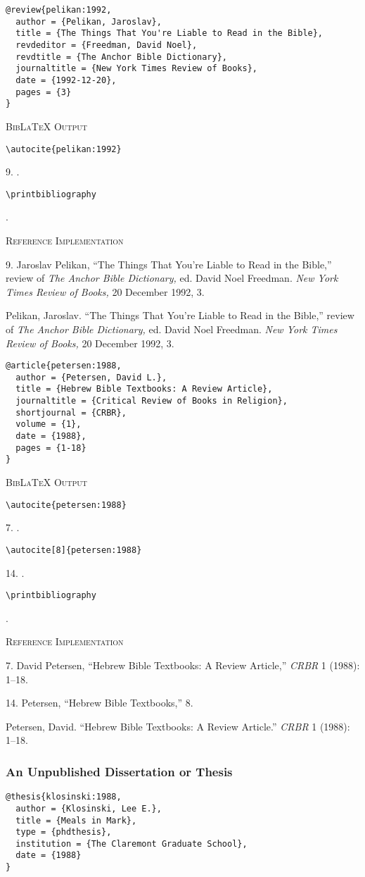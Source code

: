 \documentclass[a4paper]{article}
\newcommand\citetestnpf[4]{%
  {\textsc{BibLaTeX Output}\par
   \nobreak
   \texttt{\textbackslash autocite\{#4\}}\par
   \color{biblatex-colour}
   #1. \cite{#4}.\par
   \color{black}
   \texttt{\textbackslash autocite[#3]\{#4\}}\par
   \color{biblatex-colour}
   #2. \cite[#3]{#4}.\par
   \color{black}
   \texttt{\textbackslash printbibliography}\par
   \color{biblatex-colour}
   \hangindent\bibindent\bibentrycite{#4}.\par}}
\newcommand\citetestnsnp[2]{%
  {\textsc{BibLaTeX Output}\par
   \nobreak
   \texttt{\textbackslash autocite\{#2\}}\par
   \color{biblatex-colour}
   #1. \cite{#2}.\par
   \color{black}
   \texttt{\textbackslash printbibliography}\par
   \color{biblatex-colour}
   \hangindent\bibindent\bibentrycite{#2}.\par}}
\newenvironment{refimp}{%
  \begin{minipage}{\linewidth}
    \setlength{\parskip}{1ex}
    \textsc{Reference Implementation}\par
    \nobreak
    \color{reference-colour}
}{\end{minipage}}
\begin{document}
\begin{lstlisting}
@review{pelikan:1992,
  author = {Pelikan, Jaroslav},
  title = {The Things That You're Liable to Read in the Bible},
  revdeditor = {Freedman, David Noel},
  revdtitle = {The Anchor Bible Dictionary},
  journaltitle = {New York Times Review of Books},
  date = {1992-12-20},
  pages = {3}
}
\end{lstlisting}

\citetestnsnp{9}{pelikan:1992}

\begin{refimp}
  9. Jaroslav Pelikan, “The Things That You're Liable to Read in the Bible,”
  review of \emph{The Anchor Bible Dictionary,} ed. David Noel Freedman.
  \emph{New York Times Review of Books,} 20 December 1992, 3.
  
  \hangindent\bibindent Pelikan, Jaroslav. “The Things That You're Liable to
  Read in the Bible,” review of \emph{The Anchor Bible Dictionary,} ed. David
  Noel Freedman. \emph{New York Times Review of Books,} 20 December 1992,
  3.
\end{refimp}

\begin{lstlisting}
@article{petersen:1988,
  author = {Petersen, David L.},
  title = {Hebrew Bible Textbooks: A Review Article},
  journaltitle = {Critical Review of Books in Religion},
  shortjournal = {CRBR},
  volume = {1},
  date = {1988},
  pages = {1-18}
}
\end{lstlisting}

\citetestnpf{7}{14}{8}{petersen:1988}

\begin{refimp}
  7. David Petersen, “Hebrew Bible Textbooks: A Review Article,” \emph{CRBR} 1
  (1988): 1–18.

  14. Petersen, “Hebrew Bible Textbooks,” 8.

  \hangindent\bibindent Petersen, David. “Hebrew Bible Textbooks: A Review
  Article.” \emph{CRBR} 1 (1988): 1–18.
\end{refimp}

\subsubsection{An Unpublished Dissertation or Thesis}

\begin{lstlisting}
@thesis{klosinski:1988,
  author = {Klosinski, Lee E.},
  title = {Meals in Mark},
  type = {phdthesis},
  institution = {The Claremont Graduate School},
  date = {1988}
}
\end{lstlisting}  
\end{document}

